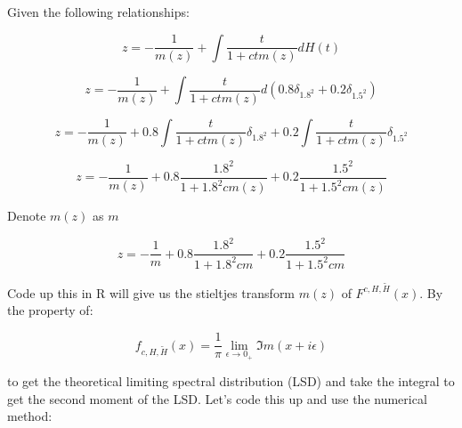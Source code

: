 \documentclass[
]{article}
\begin{document}
Given the following relationships:

\[
z = -\frac{1}{m(z)} + \int \frac{t}{1+ctm(z)} dH(t)
\]

\[
z = -\frac{1}{m(z)} + \int \frac{t}{1+ctm(z)} d(0.8 \delta_{1.8^2} + 0.2 \delta_{1.5^2})
\]

\[
z = -\frac{1}{m(z)} + 0.8 \int \frac{t}{1+ctm(z)} \delta_{1.8^2} + 0.2 \int \frac{t}{1+ctm(z)} \delta_{1.5^2}
\]

\[
z = -\frac{1}{m(z)} + 0.8 \frac{1.8^2}{1+1.8^2cm(z)} + 0.2 \frac{1.5^2}{1+1.5^2cm(z)}
\]

Denote \(m(z)\) as \(m\)

\[
z = -\frac{1}{m} + 0.8 \frac{1.8^2}{1+1.8^2cm} + 0.2 \frac{1.5^2}{1+1.5^2cm}
\]

Code up this in R will give us the stieltjes transform \(m(z)\) of
\(F^{c, H, \tilde H}(x)\). By the property of:

\[
f_{c, H, \tilde H}(x) = \frac{1}{\pi} \lim_{\epsilon \rightarrow0_+} \Im m(x + i\epsilon)
\]

to get the theoretical limiting spectral distribution (LSD) and take the
integral to get the second moment of the LSD. Let's code this up and use
the numerical method:
\end{document}

